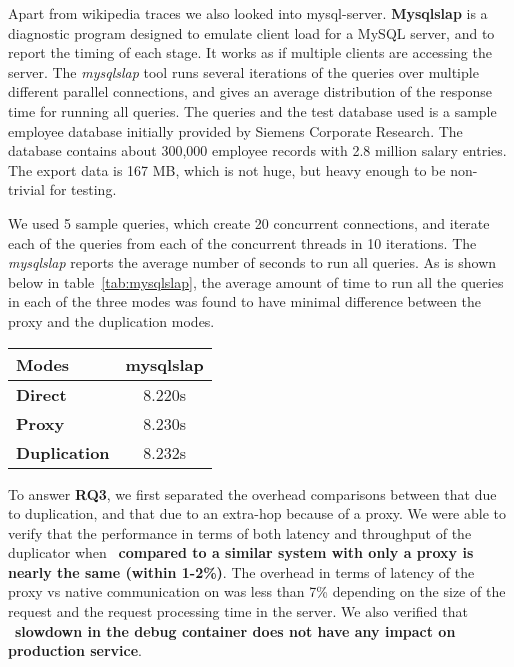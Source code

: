 Apart from wikipedia traces we also looked into mysql-server. 
\textbf{Mysqlslap} is a diagnostic program designed to emulate client load for a MySQL server, and to report the timing of each stage. 
It works as if multiple clients are accessing the server. The \emph{mysqlslap} tool runs several iterations of the queries over multiple different parallel connections, and gives an average distribution of the response time for running all queries.
The queries and the test database used is a sample employee database initially provided by Siemens Corporate Research. 
The database contains about 300,000 employee records with 2.8 million salary entries. The export data is 167 MB, which is not huge, but heavy enough to be non-trivial for testing.

We used 5 sample queries, which create 20 concurrent connections, and iterate each of the queries from each of the concurrent threads in 10 iterations.
The \emph{mysqlslap} reports the average number of seconds to run all queries. As is shown below in table~\ref{tab:mysqlslap}, the average amount of time to run all the queries in each of the three modes was found to have minimal difference between the proxy and the duplication modes.

\begin{table*}
	\centering
\begin{center}
	\begin{tabular}{l c}
	\toprule
	\textbf{Modes} & \textbf{mysqlslap}\\
	\midrule
	\textbf{Direct} & 8.220s \\
	\textbf{Proxy} & 8.230s \\
	\textbf{Duplication} & 8.232s \\
	\bottomrule
	\end{tabular}
\end{center}
\caption{Average time to finish \emph{mysqlslap} queries on a sample database}
\label{tab:mysqlslap}
\end{table*}   

\begin{comment}
\noindent \textbf{\underline{Throughput}}\\ 
To check the impact on application throughput, we looked at \emph{httperf}~\cite{httperf},  	
\end{comment}

\begin{tcolorbox}
	To answer \textbf{RQ3}, we first separated the overhead comparisons between that due to duplication, and that due to an extra-hop because of a proxy. We were able to verify that the performance in terms of both latency and throughput of the duplicator when ~\textbf{compared to a similar system with only a proxy is nearly the same (within 1-2\%)}. The overhead in terms of latency of the proxy vs native communication on was less than 7\% depending on the size of the request and the request processing time in the server. We also verified that ~\textbf{slowdown in the debug container does not have any impact on production service}. 
\end{tcolorbox}